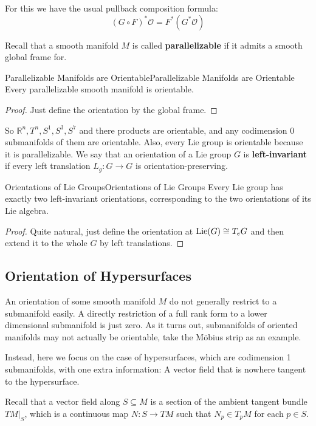 \documentclass[../main.tex]{subfiles}
\begin{document}
For this we have the usual pullback composition formula:
\begin{equation}
  (G \circ F)^* \mathcal{O} = F^*(G^* \mathcal{O})
\end{equation}

Recall that a smooth manifold $M$ is called \textbf{parallelizable} if it admits a smooth global frame for.
\begin{proposition}{Parallelizable Manifolds are Orientable}{Parallelizable Manifolds are Orientable}
  Every parallelizable smooth manifold is orientable.
\end{proposition}
\begin{proof}
  Just define the orientation by the global frame.
\end{proof}

So $\mathbb{R}^n, T^n, S^1, S^3, S^7$ and there products are orientable, and any codimension 0 submanifolds of them are orientable. Also, every Lie group is orientable because it is parallelizable. We say that an orientation of a Lie group $G$ is \textbf{left-invariant} if every left translation $L_g : G \to G$ is orientation-preserving.

\begin{proposition}{Orientations of Lie Groups}{Orientations of Lie Groups}
  Every Lie group has exactly two left-invariant orientations, corresponding to the two orientations of its Lie algebra.
\end{proposition}
\begin{proof}
  Quite natural, just define the orientation at $\operatorname{Lie}(G) \cong T_eG$ and then extend it to the whole $G$ by left translations.
\end{proof}

\subsection{Orientation of Hypersurfaces}
An orientation of some smooth manifold $M$ do not generally restrict to a submanifold easily. A directly restriction of a full rank form to a lower dimensional submanifold is just zero. As it turns out, submanifolds of oriented manifolds may not actually be orientable, take the M\"obius strip as an example.

Instead, here we focus on the case of hypersurfaces, which are codimension 1 submanifolds, with one extra information: A vector field that is nowhere tangent to the hypersurface.

Recall that a vector field along $S \subseteq M$ is a section of the ambient tangent bundle $TM|_S$, which is a continuous map $N : S \to TM$ such that $N_p \in T_pM$ for each $p \in S$. 
\end{document}
